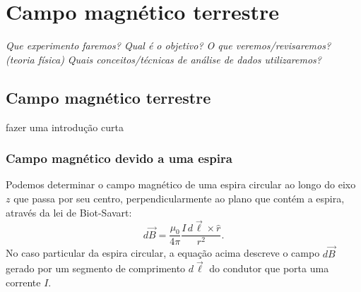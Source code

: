\chapter{Campo magnético terrestre} %
\label{Chap:CampoMagTerrestre}        %

\begin{fullwidth}\it
	Que experimento faremos?
	Qual é o objetivo?
	O que veremos/revisaremos? (teoria física)
	Quais conceitos/técnicas de análise de dados utilizaremos?
\end{fullwidth}

\section{Campo magnético terrestre}

fazer uma introdução curta

\subsection{Campo magnético devido a uma espira}


Podemos determinar o campo magnético de uma espira circular ao longo do eixo $z$ que passa por seu centro, perpendicularmente ao plano que contém a espira, através da lei de Biot-Savart:
\begin{equation}
    d\vec{B} = \frac{\mu_0}{4\pi} \frac{I\, d\vec{\ell} \times \hat{r}}{r^2}.
\end{equation}
%
No caso particular da espira circular, a equação acima descreve o campo $d\vec{B}$ gerado por um segmento de comprimento $d\vec{\ell}$ do condutor que porta uma corrente $I$.

